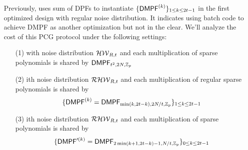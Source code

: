 Previously, \cite{cryptoeprint:2022/1035} uses sum of DPFs to instantiate $\{{\sf DMPF}^{(k)}\}_{1\le k\le 2t-1}$ in the first optimized design with regular noise distribution. It indicates using batch code to achieve DMPF as another optimization but not in the clear. We'll analyze the cost of this PCG protocol under the following settings:
\begin{itemize}
    \item[(1)]with noise distribution $\mathcal{HW}_{R,t}$ and each multiplication of sparse polynomials is shared by ${\sf DMPF}_{t^2, 2N, \mathbb{Z}_p}$
    \item[(2)]ith noise distribution $\mathcal{RHW}_{R,t}$ and each multiplication of regular sparse polynomials is shared by $$\{{\sf DMPF}^{(k)} = {\sf DMPF}_{\min(k,2t-k), 2N/t, \mathbb{Z}_p}\}_{1\le k\le 2t-1}$$
    \item[(3)]ith noise distribution $\mathcal{RHW}_{R,t}$ and each multiplication of sparse polynomials is shared by $$\{{\sf DMPF}'^{(k)} = {\sf DMPF}_{2\min(k+1, 2t-k)-1, N/t, \mathbb{Z}_p}\}_{0\le k\le 2t-1}$$
\end{itemize}

